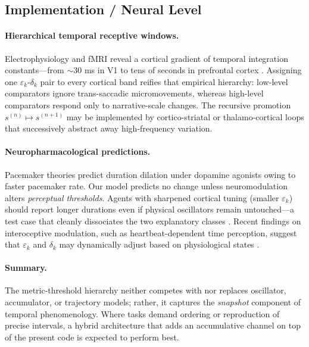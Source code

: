 \documentclass[11pt]{article}
\begin{document}
\subsection{Implementation / Neural Level}
\paragraph{Hierarchical temporal receptive windows.}
Electrophysiology and fMRI reveal a cortical gradient of temporal
integration constants—from $\sim\!30$ ms in V1 to tens of seconds in
prefrontal cortex \citep{hasson2008hierarchical}.  Assigning one
$\varepsilon_k$-$\delta_k$ pair to every cortical band reifies that
empirical hierarchy: low-level comparators ignore trans-saccadic
micromovements, whereas high-level comparators respond only to
narrative-scale changes.  The recursive promotion
$s^{(n)}\!\mapsto\!s^{(n+1)}$ may be implemented by cortico-striatal or
thalamo-cortical loops that successively abstract away high-frequency
variation.

\paragraph{Neuropharmacological predictions.}
Pacemaker theories predict duration dilation under dopamine
agonists owing to faster pacemaker rate.  Our model predicts no change
unless neuromodulation alters \emph{perceptual thresholds}.  Agents
with sharpened cortical tuning (smaller $\varepsilon_k$) should report
longer durations even if physical oscillators remain untouched—a test
case that cleanly dissociates the two explanatory classes
\citep{jazayeri2015}. Recent findings on interoceptive modulation, such
as heartbeat-dependent time perception, suggest that $\varepsilon_k$ and
$\delta_k$ may dynamically adjust based on physiological states
\citep{Arslanova2023}.

\paragraph{Summary.}
The metric-threshold hierarchy neither competes with nor replaces
oscillator, accumulator, or trajectory models; rather, it captures the
\emph{snapshot} component of temporal phenomenology.  Where tasks
demand ordering or reproduction of precise intervals, a hybrid
architecture that adds an accumulative channel on top of the present
code is expected to perform best.

\end{document}

